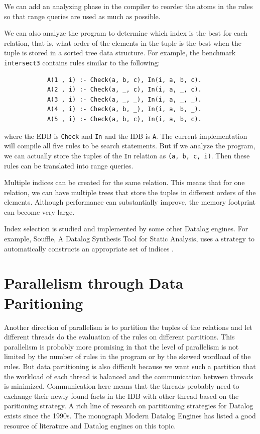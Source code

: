 \documentclass[twoside,11pt]{report}
\theoremstyle{definition}
\begin{document}
We can add an analyzing phase in the compiler to reorder the atoms in the rules so that range queries are used as much as possible.

We can also analyze the program to determine which index is the best for each relation, that is, what order of the elements in the tuple is the best when the tuple is stored in a sorted tree data structure. For example, the benchmark \texttt{intersect3} contains rules similar to the following:

\begin{verbatim}
            A(1 , i) :- Check(a, b, c), In(i, a, b, c).
            A(2 , i) :- Check(a, _, c), In(i, a, _, c).
            A(3 , i) :- Check(a, _, _), In(i, a, _, _).
            A(4 , i) :- Check(a, b, _), In(i, a, b, _).
            A(5 , i) :- Check(a, b, c), In(i, a, b, c).
\end{verbatim}

where the EDB is \texttt{Check} and \texttt{In} and the IDB is \texttt{A}. The current implementation will compile all five rules to be search statements. But if we analyze the program, we can actually store the tuples of the \texttt{In} relation as \texttt{(a, b, c, i)}. Then these rules can be translated into range queries.

Multiple indices can be created for the same relation. This means that for one relation, we can have multiple trees that store the tuples in different orders of the elements. Although performance can substantially improve, the memory footprint can become very large.

Index selection is studied and implemented by some other Datalog engines. For example, Souffle, A Datalog Synthesis Tool for Static Analysis, uses a strategy to automatically constructs an appropriate set of indices \cite{10.14778/3282495.3282500}.

\section{Parallelism through Data Paritioning}

Another direction of parallelism is to partition the tuples of the relations and let different threads do the evaluation of the rules on different partitions. This parallelism is probably more promising in that the level of parallelism is not limited by the number of rules in the program or by the skewed wordload of the rules. But data partitioning is also difficult because we want such a partition that the workload of each thread is balanced and the communication between threads is minimized. Communication here means that the threads probably need to exchange their newly found facts in the IDB with other thread based on the paritioning strategy. A rich line of research on partitioning strategies for Datalog exists since the 1990s. The monograph Modern Datalog Engines \cite{DBS-073} has listed a good resource of literature and Datalog engines on this topic.
\end{document}
